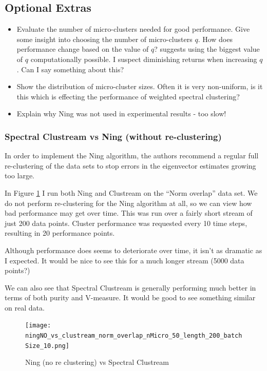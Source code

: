 \subsection{Optional Extras}

\begin{itemize}
\item  Evaluate the number of micro-clusters needed for good performance. Give some insight into choosing the number of micro-clusters $q$. How does performance change based on the value of $q$? \cite{Aggarwal2003} suggests using the biggest value of $q$ computationally possible. I suspect diminishing returns when increasing $q$. Can I say something about this?
\item Show the distribution of micro-cluster sizes. Often it is very non-uniform, is it this which is effecting the performance of weighted spectral clustering?
\item Explain why Ning was not used in experimental results - too slow!
\end{itemize}

\subsubsection{Spectral Clustream vs Ning (without re-clustering)}
\label{sec:exp_ning}

In order to implement the Ning algorithm, the authors recommend a regular full re-clustering of the data sets to stop errors in the eigenvector estimates growing too large. 

In Figure \ref{fig:ning_no_reclust} I run both Ning and Clustream on the ``Norm overlap'' data set. We do not perform re-clustering for the Ning algorithm at all, so we can view how bad performance may get over time. 
This was run over a fairly short stream of just 200 data points. Cluster performance was requested every 10 time steps, resulting in 20 performance points. 

Although performance does seems to deteriorate over time, it isn't as dramatic as I expected. It would be nice to see this for a much longer stream (5000 data points?)

We can also see that Spectral Clustream is generally performing much better in terms of both purity and V-measure. It would be good to see something similar on real data. 

\begin{figure}[h!]
  \centering
  \texttt{[image: ningNO\_vs\_clustream\_norm\_overlap\_nMicro\_50\_length\_200\_batchSize\_10.png]}
  \caption{Ning (no re clustering) vs Spectral Clustream}
\label{fig:ning_no_reclust}
\end{figure}

